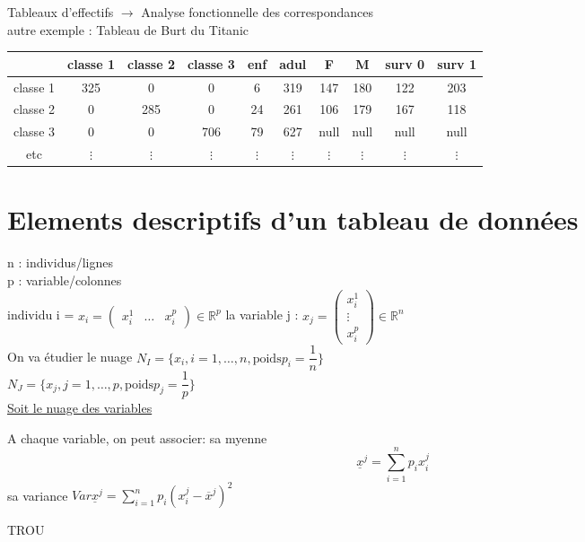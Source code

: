 \documentclass[a4paper]{report}
\begin{document}
Tableaux d'effectifs $\longrightarrow$ Analyse fonctionnelle des correspondances\\

autre exemple : Tableau de Burt du Titanic\\

\begin{tabular}
  {c|c|c|c|c|c|c|c|c|c}
  &classe 1&classe 2&classe 3&enf&adul&F&M&surv 0&surv 1\\
  \hline
  classe 1&325&0&0&6&319&147&180&122&203\\
  \hline
  classe 2&0&285&0&24&261&106&179&167&118\\
  \hline
  classe 3&0&0&706&79&627&null&null&null&null\\
  etc&$\vdots$&$\vdots$&$\vdots$&$\vdots$&$\vdots$&$\vdots$&$\vdots$&$\vdots$&$\vdots$\\
\end{tabular}

\section{Elements descriptifs d'un tableau de données}
n : individus/lignes\\
p : variable/colonnes\\

individu i = $x_{i}= \begin{pmatrix}
  x_{i}^{1}&
  \hdots&
  x_{i}^{p}
\end{pmatrix}
\in \mathbb{R}^{p}$
la variable j : $x_{j}= \begin{pmatrix}
  x_{i}^{1} \\
  \vdots \\
  x_{i}^{p}
\end{pmatrix}
\in \mathbb{R}^{n}$\\
On va étudier le nuage $N_{I}=\{x_{i} , i=1,\hdots,n, \text{poids} p_{i}=\dfrac{1}{n}\}$\\
 $N_{J}=\{x_{j} , j=1,\hdots,p , \text{poids} p_{j}=\dfrac{1}{p}\}$\\

 \underline{Soit le nuage des variables}

 A chaque variable, on peut associer:
 sa myenne
 $$\underline{x}^{j}=\sum^{n}_{i=1}p_{i}x_{i}^{j}$$
 sa variance
 $Var\underline{x}^{j}=\sum^{n}_{i=1}p_{i}(x_{i}^{j}-\overline{x}^{j})^{2}$

\vspace{2cm}
 TROU
\vspace{2cm}
\end{document}

